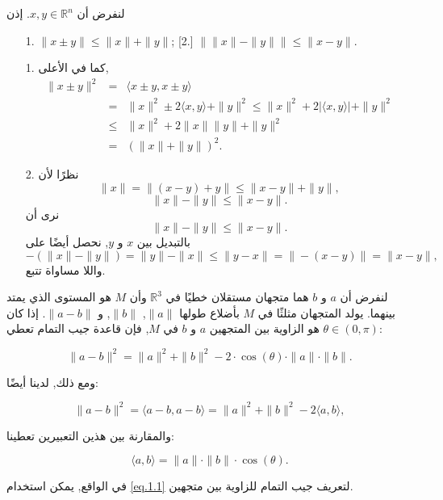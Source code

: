 \begin{lemma}
لنفرض أن \(x, y \in \mathbb{R}^n\). إذن
\begin{itemize}
    \item [1.] \(\|x \pm y\| \leq \|x\| + \|y\|\);
    [2.] \(\|\|x\| - \|y\|\| \leq \|x - y\|\).
\end{itemize}
\end{lemma}

\begin{demonstration}
\begin{itemize}
    \item [1.] كما في الأعلى,
\begin{eqnarray*} 
\|x \pm y\|^2 &=& \langle x \pm y, x \pm y \rangle\\
&=& \|x\|^2 \pm 2 \langle x, y \rangle + \|y\|^2 \leq \|x\|^2 + 2|\langle x, y \rangle| + \|y\|^2\\
&\leq& \|x\|^2 + 2\|x\|\|y\| + \|y\|^2\\
&=& (\|x\| + \|y\|)^2. 
\end{eqnarray*}
\item [2.] نظرًا لأن
\[ \|x\| = \|(x - y) + y\| \leq \|x - y\| + \|y\|, \]
\[ \|x\| - \|y\| \leq \|x - y\|. \]
نرى أن
\[ \|x\| - \|y\| \leq \|x - y\|. \]
بالتبديل بين \( x \) و \( y \), نحصل أيضًا على
\[ -(\|x\| - \|y\|) = \|y\| - \|x\| \leq \|y - x\| = \|- (x - y)\| = \|x - y\|, \]
واللا مساواة تتبع.
\end{itemize}
\end{demonstration}


لنفرض أن \( a \) و \( b \) هما متجهان مستقلان خطيًا في \( \mathbb{R}^3 \) وأن \( M \) هو المستوى الذي يمتد بينهما. يولد المتجهان مثلثًا في \( M \) بأضلاع طولها \( \|a\| \), \( \|b\| \), و \( \|a - b\| \). إذا كان \( \theta \in (0, \pi) \) هو الزاوية بين المتجهين \( a \) و \( b \) في \( M \), فإن قاعدة جيب التمام تعطي:

\[ \|a - b\|^2 = \|a\|^2 + \|b\|^2 - 2 \cdot \cos(\theta) \cdot \|a\| \cdot \|b\|. \]

ومع ذلك, لدينا أيضًا:

\[ \|a - b\|^2 = \langle a - b, a - b \rangle = \|a\|^2 + \|b\|^2 - 2 \langle a, b \rangle, \]

والمقارنة بين هذين التعبيرين تعطينا:

\begin{equation}\label{eq.1.1}
    \langle a, b \rangle = \|a\| \cdot \|b\| \cdot \cos(\theta).
\end{equation} 

في الواقع, يمكن استخدام \eqref{eq.1.1} لتعريف جيب التمام للزاوية بين متجهين.
    
